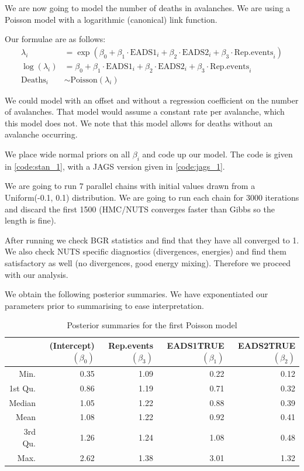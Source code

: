\documentclass[10pt]{extarticle}
\begin{document}
We are now going to model the number of deaths in avalanches. We are using a Poisson model with a logarithmic (canonical) link function. 

Our formulae are as follows:
\begin{align*}
\lambda_i &= \exp(\beta_0 + \beta_1 \cdot \mathrm{EADS1}_i + \beta_2 \cdot \mathrm{EADS2}_i + \beta_3 \cdot \mathrm{Rep.events}_i)\\
\log(\lambda_i) &= \beta_0 + \beta_1 \cdot \mathrm{EADS1}_i + \beta_2 \cdot \mathrm{EADS2}_i + \beta_3 \cdot \mathrm{Rep.events}_i\\
\mathrm{Deaths}_i &\sim \mathrm{Poisson}(\lambda_i)
\end{align*}

We could model with an offset and without a regression coefficient on the number of avalanches. That model would assume a constant rate per avalanche, which this model does not. We note that this model allows for deaths without an avalanche occurring.

We place wide normal priors on all $\beta_i$ and code up our model. The code is given in \ref{code:stan_1}, with a JAGS version given in \ref{code:jags_1}. 

We are going to run $7$ parallel chains with initial values drawn from a Uniform(-0.1, 0.1) distribution. We are going to run each chain for 3000 iterations and discard the first 1500 (HMC/NUTS converges faster than Gibbs so the length is fine). 

After running we check BGR statistics and find that they have all converged to 1. We also check NUTS specific diagnostics (divergences, energies) and find them satisfactory as well (no divergences, good energy mixing). Therefore we proceed with our analysis.

We obtain the following posterior summaries. We have exponentiated our parameters prior to summarising to ease interpretation.

\begin{table}[ht]
	\centering
\begin{tabular}{r|rrrr}
	\hline
	& (Intercept) $(\beta_0)$ & Rep.events $(\beta_3)$ & EADS1TRUE $(\beta_1)$ & EADS2TRUE $(\beta_2)$\\ 
	\hline
	Min. & 0.35 & 1.09 & 0.22 & 0.12 \\ 
	1st Qu. & 0.86 & 1.19 & 0.71 & 0.32 \\ 
	Median & 1.05 & 1.22 & 0.88 & 0.39 \\ 
	Mean & 1.08 & 1.22 & 0.92 & 0.41 \\ 
	3rd Qu. & 1.26 & 1.24 & 1.08 & 0.48 \\ 
	Max. & 2.62 & 1.38 & 3.01 & 1.32 \\ 
	\hline
\end{tabular}
\caption{Posterior summaries for the first Poisson model}
\label{tab:postsum_po}
\end{table}
\end{document}
